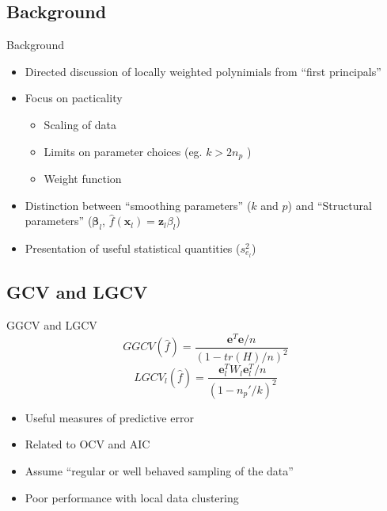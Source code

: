 \documentclass[xcolor=x11names,compress]{beamer}
\renewcommand{\(}{\begin{columns}}
\renewcommand{\)}{\end{columns}}
\newcommand{\<}[1]{\begin{column}{#1}}
\renewcommand{\>}{\end{column}}
\begin{document}
\subsection{Background}
\begin{frame}{Background}
\begin{itemize}
\item Directed discussion of locally weighted polynimials from ``first principals''
\pause
\item Focus on pacticality
	\begin{itemize}
	\item Scaling of data
	\item Limits on parameter choices (eg. $k>2n_p$ )
	\item Weight function 
	\end{itemize}
\pause
\item Distinction between ``smoothing parameters'' ($k$ and $p$) and ``Structural parameters'' ($\mathbf{\beta}_l$, $\hat{f}(\mathbf{x}_l) = \mathbf{z}_l\beta_l$)
\pause
\item Presentation of useful statistical quantities ($s^2_{e_l}$)
\end{itemize}
\end{frame}

\subsection{GCV and LGCV}
\begin{frame}{GGCV and LGCV}
$$GGCV(\hat{f})=\frac{\mathbf{e}^T\mathbf{e}/n}{\left(1-tr(H)/n\right)^2}$$
$$LGCV_l(\hat{f})=\frac{\mathbf{e}^T_lW_l\mathbf{e}^T_l/n}{\left(1-n_p'/k\right)^2}$$

\begin{itemize}
	\item Useful measures of predictive error
	\item Related to OCV and AIC
	\item Assume ``regular or well behaved sampling of the data''
	\item Poor performance with local data clustering
\end{itemize}
\end{frame}

\end{document}
